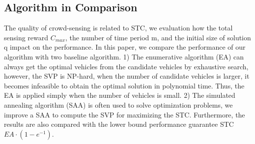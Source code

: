 \documentclass[journal]{IEEEtran}
\begin{document}
\subsection{Algorithm in Comparison}
The quality of crowd-sensing is related to STC, we evaluation how the total sensing reward $C_{max}$, the number of time period m, and the initial size of solution q impact on the performance. In this paper, we compare the performance of our algorithm with two baseline algorithm. 1) The enumerative algorithm (EA) can always get the optimal vehicles from the candidate vehicles by exhaustive search, however, the SVP is NP-hard, when the number of candidate vehicles is larger, it becomes infeasible to obtain the optimal solution in polynomial time. Thus, the EA is applied simply when the number of vehicles is small. 2) The simulated annealing algorithm (SAA) is often used to solve optimization problems, we improve a SAA to compute the SVP for maximizing the STC. Furthermore, the results are also compared with the lower bound performance guarantee STC $EA\cdot(1-e^{-1})$.
\end{document}
